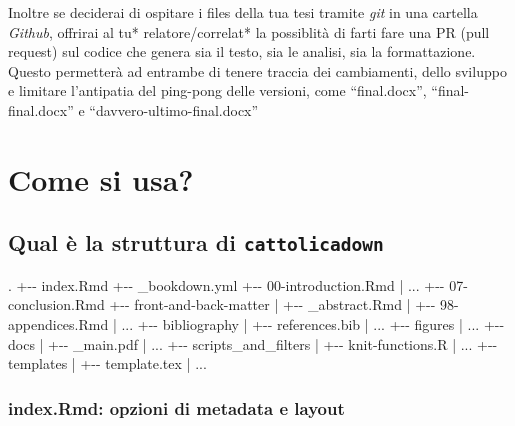 \documentclass[a4paper, 11pt, nobind]{templates/ociamthesis}
\newenvironment{Shaded}{\begin{snugshade}}{\end{snugshade}}
\newcommand{\NormalTok}[1]{#1}
\renewenvironment{Shaded}
{
  \vspace{10pt}%
  \begin{snugshade}%
}{%
  \end{snugshade}%
  \vspace{8pt}%
}
\begin{document}
Inoltre se deciderai di ospitare i files della tua tesi tramite \emph{git} in una cartella \emph{Github}, offrirai al tu* relatore/correlat* la possiblità di farti fare una PR (pull request) sul codice che genera sia il testo, sia le analisi, sia la formattazione. Questo permetterà ad entrambe di tenere traccia dei cambiamenti, dello sviluppo e limitare l'antipatia del ping-pong delle versioni, come ``final.docx'', ``final-final.docx'' e ``davvero-ultimo-final.docx''

\hypertarget{come-si-usa}{%
\chapter{Come si usa?}\label{come-si-usa}}

\minitoc 

\hypertarget{qual-uxe8-la-struttura-di-cattolicadown}{%
\section{\texorpdfstring{Qual è la struttura di \texttt{cattolicadown}}{Qual è la struttura di cattolicadown}}\label{qual-uxe8-la-struttura-di-cattolicadown}}

\begin{Shaded}
\begin{Highlighting}[]
\NormalTok{.}
\NormalTok{+{-}{-} index.Rmd}
\NormalTok{+{-}{-} \_bookdown.yml}
\NormalTok{+{-}{-} 00{-}introduction.Rmd}
\NormalTok{|   ...}
\NormalTok{+{-}{-} 07{-}conclusion.Rmd}
\NormalTok{+{-}{-} front{-}and{-}back{-}matter}
\NormalTok{|   +{-}{-} \_abstract.Rmd}
\NormalTok{|   +{-}{-} 98{-}appendices.Rmd}
\NormalTok{|   ...}
\NormalTok{+{-}{-} bibliography}
\NormalTok{|   +{-}{-} references.bib}
\NormalTok{|   ...}
\NormalTok{+{-}{-} figures}
\NormalTok{|   ...}
\NormalTok{+{-}{-} docs}
\NormalTok{|   +{-}{-} \_main.pdf}
\NormalTok{|   ...}
\NormalTok{+{-}{-} scripts\_and\_filters}
\NormalTok{|   +{-}{-} knit{-}functions.R}
\NormalTok{|   ...}
\NormalTok{+{-}{-} templates}
\NormalTok{|   +{-}{-} template.tex}
\NormalTok{|   ...}
\end{Highlighting}
\end{Shaded}

\hypertarget{index.rmd-opzioni-di-metadata-e-layout}{%
\subsection{\texorpdfstring{index.Rmd: \textbf{opzioni di metadata e layout}}{index.Rmd: opzioni di metadata e layout}}\label{index.rmd-opzioni-di-metadata-e-layout}}
\end{document}
